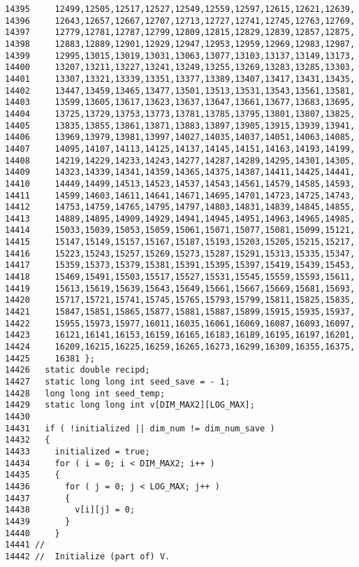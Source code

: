 \begin{Code}
\begin{verbatim}
14395     12499,12505,12517,12527,12549,12559,12597,12615,12621,12639,
14396     12643,12657,12667,12707,12713,12727,12741,12745,12763,12769,
14397     12779,12781,12787,12799,12809,12815,12829,12839,12857,12875,
14398     12883,12889,12901,12929,12947,12953,12959,12969,12983,12987,
14399     12995,13015,13019,13031,13063,13077,13103,13137,13149,13173,
14400     13207,13211,13227,13241,13249,13255,13269,13283,13285,13303,
14401     13307,13321,13339,13351,13377,13389,13407,13417,13431,13435,
14402     13447,13459,13465,13477,13501,13513,13531,13543,13561,13581,
14403     13599,13605,13617,13623,13637,13647,13661,13677,13683,13695,
14404     13725,13729,13753,13773,13781,13785,13795,13801,13807,13825,
14405     13835,13855,13861,13871,13883,13897,13905,13915,13939,13941,
14406     13969,13979,13981,13997,14027,14035,14037,14051,14063,14085,
14407     14095,14107,14113,14125,14137,14145,14151,14163,14193,14199,
14408     14219,14229,14233,14243,14277,14287,14289,14295,14301,14305,
14409     14323,14339,14341,14359,14365,14375,14387,14411,14425,14441,
14410     14449,14499,14513,14523,14537,14543,14561,14579,14585,14593,
14411     14599,14603,14611,14641,14671,14695,14701,14723,14725,14743,
14412     14753,14759,14765,14795,14797,14803,14831,14839,14845,14855,
14413     14889,14895,14909,14929,14941,14945,14951,14963,14965,14985,
14414     15033,15039,15053,15059,15061,15071,15077,15081,15099,15121,
14415     15147,15149,15157,15167,15187,15193,15203,15205,15215,15217,
14416     15223,15243,15257,15269,15273,15287,15291,15313,15335,15347,
14417     15359,15373,15379,15381,15391,15395,15397,15419,15439,15453,
14418     15469,15491,15503,15517,15527,15531,15545,15559,15593,15611,
14419     15613,15619,15639,15643,15649,15661,15667,15669,15681,15693,
14420     15717,15721,15741,15745,15765,15793,15799,15811,15825,15835,
14421     15847,15851,15865,15877,15881,15887,15899,15915,15935,15937,
14422     15955,15973,15977,16011,16035,16061,16069,16087,16093,16097,
14423     16121,16141,16153,16159,16165,16183,16189,16195,16197,16201,
14424     16209,16215,16225,16259,16265,16273,16299,16309,16355,16375,
14425     16381 };
14426   static double recipd;
14427   static long long int seed_save = - 1;
14428   long long int seed_temp;
14429   static long long int v[DIM_MAX2][LOG_MAX];
14430 
14431   if ( !initialized || dim_num != dim_num_save )
14432   {
14433     initialized = true;
14434     for ( i = 0; i < DIM_MAX2; i++ )
14435     {
14436       for ( j = 0; j < LOG_MAX; j++ )
14437       {
14438         v[i][j] = 0;
14439       }
14440     }
14441 //
14442 //  Initialize (part of) V.

\end{verbatim}
\end{Code}
